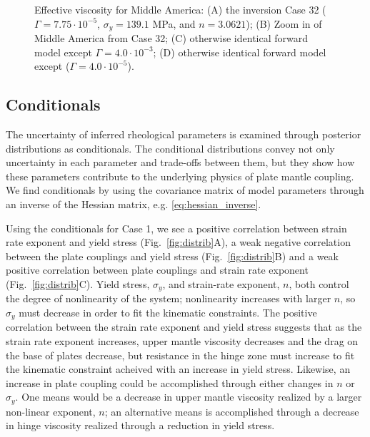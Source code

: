 \documentclass[12pt]{article}
\begin{document}
{\begin{figure}[H]
\caption{Effective viscosity for Middle America: (A) the inversion Case 32 ($\Gamma = 7.75 \cdot 10^{-5}$, $\sigma_y = 139.1$ MPa, and $n = 3.0621$);  (B) Zoom in of Middle America from Case 32; (C) otherwise identical forward model except $\Gamma = 4.0 \cdot 10^{-3}$;
(D) otherwise identical forward model except ($\Gamma = 4.0 \cdot 10^{-5}$).}
\label{fig:middle_physics}
\end{figure}


\subsection{Conditionals}

The uncertainty of inferred rheological parameters is examined through posterior distributions as conditionals. The conditional distributions convey not only uncertainty in each parameter and trade-offs between them, but they show how these parameters contribute to the underlying physics of plate mantle coupling. 
We find conditionals by using the covariance matrix of model parameters
through an inverse of the Hessian matrix, e.g. \eqref{eq:hessian_inverse}.

Using the conditionals for Case 1, we see a positive correlation between strain rate exponent and yield stress (Fig.~\ref{fig:distrib}A), a weak negative correlation between the plate couplings and yield stress (Fig.~\ref{fig:distrib}B) and a weak positive correlation between plate couplings and strain rate exponent (Fig.~\ref{fig:distrib}C). 
Yield stress, $\sigma_y$, and strain-rate exponent, $n$, both control the degree of nonlinearity of the system; nonlinearity increases with larger $n$, so $\sigma_y$ must decrease in order to fit the kinematic constraints.
The positive correlation between the strain rate exponent and yield stress suggests that as the strain rate exponent increases, upper mantle viscosity decreases and the drag on the base of plates decrease, but resistance in the hinge zone must increase to fit the kinematic constraint acheived with an increase in yield stress. 
Likewise, an increase in plate coupling could be accomplished through either changes in $n$ or $\sigma_y$. One means would be a decrease in upper mantle viscosity realized by a larger non-linear exponent, $n$;  
an alternative means is accomplished through a decrease in hinge viscosity realized through a reduction in yield stress.  


}
\end{document}
